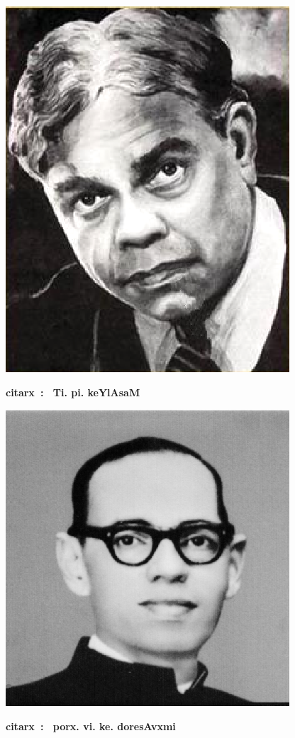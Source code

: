 \begin{minipage}[r]{4cm}
  \centering\includegraphics[scale=0.8]{src/figures/t_p_kailasam.eps}
   
  {\bf citarx~:~ Ti. pi. keYlAsaM}
  \end{minipage}
  \qquad 
\begin{minipage}[l]{5cm}
  \centering\includegraphics[scale=0.8]{src/figures/v_k_doreswamy.eps}
   
  {\bf citarx~:~ porx. vi. ke. doresAvxmi}
  \end{minipage}
    

